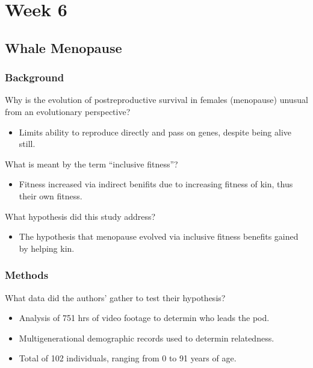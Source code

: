 \documentclass[12pt,a4paper]{article}
\begin{document}
\tableofcontents
\cleardoublepage
\fancyhead{}

\clearpage
\section*{Week 6}
{}

\subsection{Whale Menopause}
\subsubsection{Background}
\begin{itemize}
    {\color{G-Moon}\item Why is the evolution of postreproductive survival in females (menopause) unusual from an evolutionary perspective?}
        \begin{itemize}
            \item Limits ability to reproduce directly and pass on genes, despite being alive still.
        \end{itemize}
    {\color{G-Moon}\item What is meant by the term “inclusive fitness”?}
        \begin{itemize}
            \item Fitness increased via indirect benifits due to increasing fitness of kin, thus their own fitness.
        \end{itemize}
    {\color{G-Moon}\item What hypothesis did this study address?}
        \begin{itemize}
            \item The hypothesis that menopause evolved via inclusive fitness benefits gained by helping kin.
        \end{itemize}
\end{itemize}
\subsubsection{Methods}
\begin{itemize}
    {\color{G-Moon}\item What data did the authors’ gather to test their hypothesis?}
        \begin{itemize}
            \item Analysis of 751 hrs of video footage to determin who leads the pod.
            \item Multigenerational demographic records used to determin relatedness.
            \item Total of 102 individuals, ranging from 0 to 91 years of age.
        \end{itemize}
\end{itemize}
\end{document}
